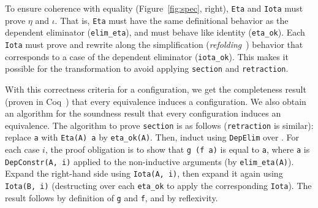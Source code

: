 
To ensure coherence with equality (Figure~\ref{fig:spec}, right),
\lstinline{Eta} and \lstinline{Iota} must prove $\eta$ and $\iota$.
That is, \lstinline{Eta} must have the same definitional behavior as the dependent eliminator (\lstinline{elim_eta}),
and must behave like identity (\lstinline{eta_ok}).
Each \lstinline{Iota} must prove and rewrite along the simplification (\textit{refolding}~\cite{boutillier:tel-01054723}) behavior that corresponds to a case of the dependent eliminator (\lstinline{iota_ok}).
This makes it possible for the transformation to
avoid applying \lstinline{section} and \lstinline{retraction}.

With this correctness criteria for a configuration, we get the completeness result (proven in Coq~) that every equivalence induces a configuration. %
We also obtain an algorithm for the soundness result that every configuration induces an equivalence.
The algorithm to prove \lstinline{section} is as follows (\lstinline{retraction} is similar):
replace \lstinline{a} with \lstinline{Eta(A) a} by \lstinline{eta_ok(A)}.
Then, induct using \lstinline{DepElim} over \A.
For each case $i$, the proof obligation is to show that \lstinline{g (f a)} is equal to \lstinline{a},
where \lstinline{a} is \lstinline{DepConstr(A, i)} applied to the non-inductive arguments (by \lstinline{elim_eta(A)}).
Expand the right-hand side using \lstinline{Iota(A, i)}, then expand it again using \lstinline{Iota(B, i)}
(destructing over each \lstinline{eta_ok} to apply the corresponding \lstinline{Iota}).
The result follows by definition of \lstinline{g} and \lstinline{f}, and by reflexivity.

